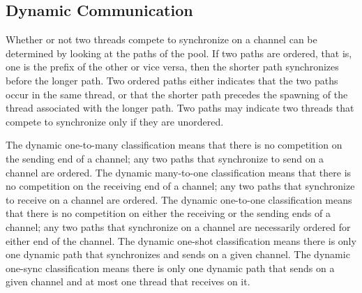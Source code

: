 \documentclass[letterpaper, 11pt]{report}
\begin{document}
\subsection{Dynamic Communication}

Whether or not two threads compete to
synchronize on a channel can be determined by
looking at the paths of the pool. If two paths are ordered, that is, one is the
prefix of the other or vice versa, then the shorter path synchronizes before the longer path.
Two ordered paths either indicates that the two paths occur in the same thread, or
that the shorter path precedes the spawning of the thread associated with the longer path.
Two paths may indicate two threads that compete to synchronize only if they are unordered.

The dynamic one-to-many classification means that there
is no competition on the sending end of a channel; any two paths that synchronize to
send on a channel are ordered.
The dynamic many-to-one classification means that
there is no competition on the receiving end of a channel; any two paths that synchronize to
receive on a channel are ordered.
The dynamic one-to-one classification means that there is no
competition on either the receiving or the sending ends of a channel; any two paths that
synchronize on a channel are necessarily ordered for either end of the channel. 
The dynamic one-shot classification means there is only one dynamic path
that synchronizes and sends on a given channel. The dynamic one-sync classification means
there is only one dynamic path that sends on a given channel and at most one thread
that receives on it.
\end{document}
